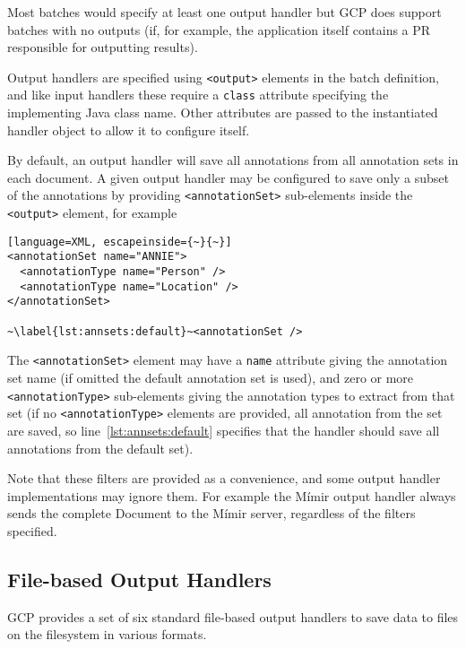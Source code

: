 Most batches would specify at least one output handler but GCP does support
batches with no outputs (if, for example, the application itself contains a PR
responsible for outputting results).

Output handlers are specified using \verb!<output>! elements in the batch
definition, and like input handlers these require a \verb!class! attribute
specifying the implementing Java class name.  Other attributes are passed to
the instantiated handler object to allow it to configure itself.

By default, an output handler will save all annotations from all annotation
sets in each document.  A given output handler may be configured to save only a
subset of the annotations by providing \verb!<annotationSet>! sub-elements
inside the \verb!<output>! element, for example

\begin{lstlisting}[language=XML, escapeinside={~}{~}]
<annotationSet name="ANNIE">
  <annotationType name="Person" />
  <annotationType name="Location" />
</annotationSet>

~\label{lst:annsets:default}~<annotationSet />
\end{lstlisting}

The \verb!<annotationSet>! element may have a \verb!name! attribute giving the
annotation set name (if omitted the default annotation set is used), and zero
or more \verb!<annotationType>! sub-elements giving the annotation types to
extract from that set (if no \verb!<annotationType>! elements are provided, all
annotation from the set are saved, so line~\ref{lst:annsets:default} specifies
that the handler should save all annotations from the default set).

Note that these filters are provided as a convenience, and some output handler
implementations may ignore them.  For example the M\'{i}mir output handler
always sends the complete Document to the M\'{i}mir server, regardless of the
filters specified.

\subsection{File-based Output Handlers}\label{sec:batch-def:file-output-handlers}

GCP provides a set of six standard file-based output handlers to save data to
files on the filesystem in various formats.

